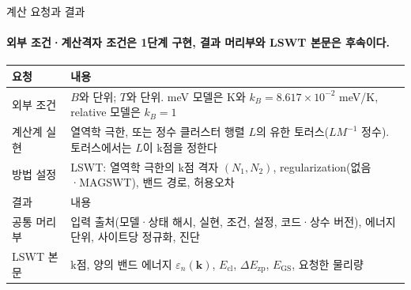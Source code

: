 \begin{frame}[label=request-result]{계산 요청과 결과}
  \framesubtitle{외부 조건·계산격자 조건은 1단계 구현, 결과 머리부와 LSWT 본문은 후속이다.}
  \small
  \begin{tabularx}{\textwidth}{@{}p{2.3cm}Y@{}}
    \toprule
    요청 & 내용 \\
    \midrule
    외부 조건 & $B$와 단위; $T$와 단위. meV 모델은 K와 $k_B=8.617\times10^{-2}$ meV/K, relative 모델은 $k_B=1$ \\
    계산계 실현 & 열역학 극한, 또는 정수 클러스터 행렬 $L$의 유한 토러스($LM^{-1}$ 정수). 토러스에서는 $L$이 k점을 정한다 \\
    방법 설정 & LSWT: 열역학 극한의 k점 격자 $(N_1,N_2)$, regularization(없음·MAGSWT), 밴드 경로, 허용오차 \\
    \midrule
    결과 & 내용 \\
    \midrule
    공통 머리부 & 입력 출처(모델·상태 해시, 실현, 조건, 설정, 코드·상수 버전), 에너지 단위, 사이트당 정규화, 진단 \\
    LSWT 본문 & k점, 양의 밴드 에너지 $\varepsilon_n(\mathbf k)$, $E_{\mathrm{cl}}$, $\Delta E_{\mathrm{zp}}$, $E_{\mathrm{GS}}$, 요청한 물리량 \\
    \bottomrule
  \end{tabularx}
  \par\medskip
\end{frame}

